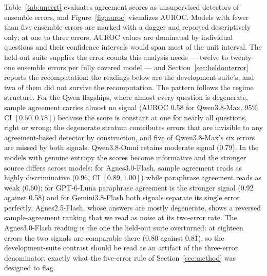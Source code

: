 Table~\ref{tab:uncert} evaluates agreement scores as unsupervised detectors of ensemble errors, and Figure~\ref{fig:auroc} visualizes AUROC. Models with fewer than five ensemble errors are marked with a dagger and reported descriptively only; at one to three errors, AUROC values are dominated by individual questions and their confidence intervals would span most of the unit interval. The held-out suite supplies the error counts this analysis needs --- twelve to twenty-one ensemble errors per fully covered model --- and Section~\ref{sec:heldouterror} reports the recomputation; the readings below are the development suite's, and two of them did not survive the recomputation. The pattern follows the regime structure. For the Qwen flagships, where almost every question is degenerate, sample agreement carries almost no signal (AUROC 0.58 for Qwen3.8-Max, 95\% CI $[0.50, 0.78]$) because the score is constant at one for nearly all questions, right or wrong; the degenerate stratum contributes errors that are invisible to any agreement-based detector by construction, and five of Qwen3.8-Max's six errors are missed by both signals. Qwen3.8-Omni retains moderate signal (0.79). In the models with genuine entropy the scores become informative and the stronger source differs across models: for Agnes3.0-Flash, sample agreement reads as highly discriminative (0.96, CI $[0.89, 1.00]$) while paraphrase agreement reads as weak (0.60); for GPT-6-Luna paraphrase agreement is the stronger signal (0.92 against 0.58) and for Gemini3.8-Flash both signals separate its single error perfectly. Agnes2.5-Flash, whose answers are mostly degenerate, shows a reversed sample-agreement ranking that we read as noise at its two-error rate. The Agnes3.0-Flash reading is the one the held-out suite overturned: at eighteen errors the two signals are comparable there (0.80 against 0.81), so the development-suite contrast should be read as an artifact of the three-error denominator, exactly what the five-error rule of Section~\ref{sec:method} was designed to flag.

\begin{table}[htbp]
\centering
\footnotesize
\caption{Uncertainty estimation on the development suite. Error rate of the COMB-12 reference; AUROC of reversed agreement scores for predicting ensemble errors (95\% bootstrap CI where the model has at least five errors); and the area under the risk-coverage curve (AURC; lower is better), computed by accepting questions in decreasing order of confidence with ties broken uniformly at random and averaged over 1{,}000 permutations, so a random ranking yields AURC equal to the error-rate column. Both is the sum of the two disagreement scores (AUROC only). $^\dagger$Fewer than five errors: descriptive only. Dashes indicate constant scores or zero errors.}
\label{tab:uncert}

\end{table}

